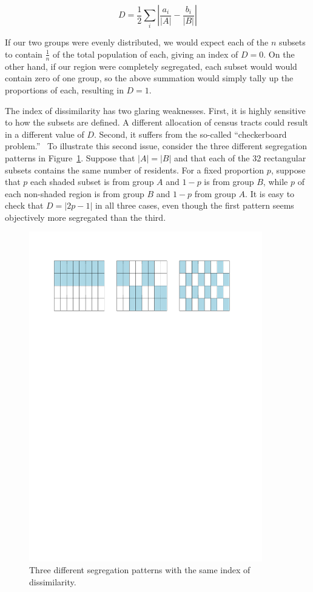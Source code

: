 \documentclass{article}
\theoremstyle{theorem}
\theoremstyle{definition}
\begin{document}
\begin{equation}
  D = \frac{1}{2} \sum_i \left\lvert \frac{a_i}{\lvert A \rvert} - \frac{b_i}{\lvert B \rvert} \right\rvert
\end{equation}

If our two groups were evenly distributed, we would expect each of the $n$ subsets to contain $\frac{1}{n}$ of the total population of each, giving an index of $D = 0$. On the other hand, if our region were completely segregated, each subset would would contain zero of one group, so the above summation would simply tally up the proportions of each, resulting in $D = 1$.

The index of dissimilarity has two glaring weaknesses. First, it is highly sensitive to how the subsets are defined. A different allocation of census tracts could result in a different value of $D$. Second, it suffers from the so-called ``checkerboard problem.''~\cite{morrill91} To illustrate this second issue, consider the three different segregation patterns in Figure~\ref{fig:checkerboard}. Suppose that $|A| = |B|$ and that each of the 32 rectangular subsets contains the same number of residents. For a fixed proportion $p$, suppose that $p$ each shaded subset is from group $A$ and $1-p$ is from group $B$, while $p$ of each non-shaded region is from group $B$ and $1-p$ from group $A$. It is easy to check that $D = \lvert 2p-1 \rvert$ in all three cases, even though the first pattern seems objectively more segregated than the third.

\begin{figure}\centering
  \includegraphics[width=4in]{checkerboard.pdf}
  \caption{Three different segregation patterns with the same index of dissimilarity.}
  \label{fig:checkerboard}
\end{figure}
\end{document}
